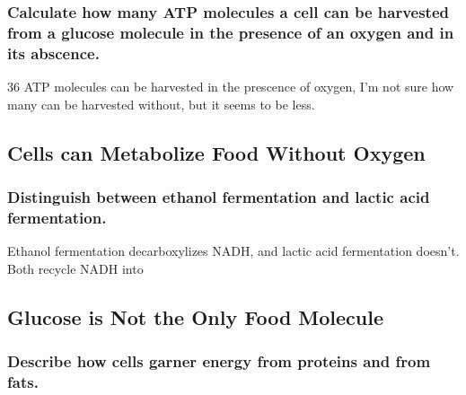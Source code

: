 \documentclass[a4paper]{article}
\begin{document}
\subsubsection{Calculate how many ATP molecules a cell can be harvested from a glucose molecule in the presence of an oxygen and 
in its abscence.}
36 ATP molecules can be harvested in the prescence of oxygen, I'm not sure how many can be harvested without, but it seems to be less.


\subsection{Cells can Metabolize Food Without Oxygen}
\subsubsection{Distinguish between ethanol fermentation and lactic acid fermentation.}
Ethanol fermentation decarboxylizes NADH, and lactic acid fermentation doesn't. 
Both recycle NADH into 


\subsection{Glucose is Not the Only Food Molecule}
\subsubsection{Describe how cells garner energy from proteins and from fats.}
\end{document}
